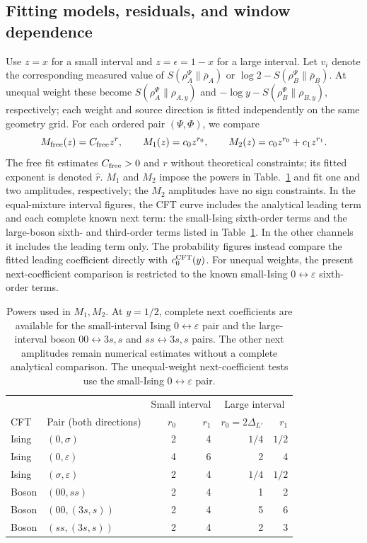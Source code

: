 \documentclass[11pt]{article}
\newcommand{\ep}{\epsilon}
\begin{document}
\subsection{Fitting models, residuals, and window dependence}
\label{app:num-fitting}
Use $z=x$ for a small interval and $z=\ep=1-x$ for a large
interval. Let $v_i$ denote the corresponding measured value of
$S(\rho_A^\Psi\|\bar\rho_A)$ or
$\log2-S(\rho_B^\Psi\|\bar\rho_B)$. At unequal weight these become
$S(\rho_A^\Psi\|\rho_{A,y})$ and
$-\log y-S(\rho_B^\Psi\|\rho_{B,y})$, respectively; each weight
and source direction is fitted independently on the same geometry grid.
For each ordered pair $(\Psi,\Phi)$, we compare
\begin{equation}
 M_{\rm free}(z)=C_{\rm free}z^r,\qquad
 M_1(z)=c_0z^{r_0},\qquad
 M_2(z)=c_0z^{r_0}+c_1z^{r_1}.
 \label{eq:num-fits}
\end{equation}
The free fit estimates $C_{\rm free}>0$ and $r$ without theoretical
constraints; its fitted exponent is denoted $\widehat r$.
$M_1$ and $M_2$ impose the powers in
Table.~\ref{tab:num-powers} and fit one and two amplitudes,
respectively; the $M_2$ amplitudes have no sign constraints.
In the equal-mixture interval figures, the CFT curve includes the analytical leading term and each
complete known next term: the small-Ising sixth-order terms and
the large-boson sixth- and third-order terms listed in
Table~\ref{tab:num-powers}. In the other channels it includes
the leading term only. The probability figures instead compare
the fitted leading coefficient directly with $c_0^{\rm CFT}(y)$.
For unequal weights, the present next-coefficient comparison is
restricted to the known small-Ising $0\leftrightarrow\varepsilon$
sixth-order terms.
\begin{table}[htbp]\centering\small
\begin{tabular}{llrrrr}\toprule
 & & \multicolumn{2}{c}{Small interval} & \multicolumn{2}{c}{Large interval}\\
CFT & Pair (both directions) & $r_0$ & $r_1$ & $r_0=2\Delta_{L'}$ & $r_1$\\\midrule
Ising & $(0,\sigma)$ & 2 & 4 & $1/4$ & $1/2$\\
Ising & $(0,\varepsilon)$ & 4 & 6 & 2 & 4\\
Ising & $(\sigma,\varepsilon)$ & 2 & 4 & $1/4$ & $1/2$\\
Boson & $(00,ss)$ & 2 & 4 & 1 & 2\\
Boson & $(00,(3s,s))$ & 2 & 4 & 5 & 6\\
Boson & $(ss,(3s,s))$ & 2 & 4 & 2 & 3\\\bottomrule
\end{tabular}
\caption{Powers used in $M_1,M_2$. At $y=1/2$, complete next coefficients are
available for the small-interval Ising $0\leftrightarrow\varepsilon$
pair and the large-interval boson $00\leftrightarrow3s,s$ and
$ss\leftrightarrow3s,s$ pairs. The other next amplitudes remain
numerical estimates without a complete analytical comparison.
The unequal-weight next-coefficient tests use the small-Ising
$0\leftrightarrow\varepsilon$ pair.}
\label{tab:num-powers}
\end{table}
\end{document}
